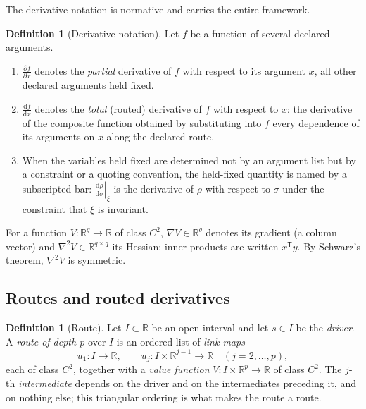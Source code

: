 \documentclass[11pt]{book}
\theoremstyle{plain}
\theoremstyle{definition}
\newtheorem{definition}[theorem]{Definition}
\theoremstyle{remark}
\newcommand{\SigmaM}{\Sigma_M}                   %
\newcommand{\dd}{\mathrm{d}}                                  %
\newcommand{\pd}[2]{\frac{\partial #1}{\partial #2}}          %
\newcommand{\td}[2]{\frac{\dd #1}{\dd #2}}                    %
\newcommand{\atfixed}[2]{\left.#1\right|_{#2}}                %
\begin{document}
The derivative notation is normative and carries the entire framework.

\begin{definition}[Derivative notation]\label{def:spine:notation}
Let $f$ be a function of several declared arguments.
\begin{enumerate}
  \item $\pd{f}{x}$ denotes the \emph{partial} derivative of $f$ with respect
        to its argument $x$, all other declared arguments held fixed.
  \item $\td{f}{x}$ denotes the \emph{total} (routed) derivative of $f$ with
        respect to $x$: the derivative of the composite function obtained by
        substituting into $f$ every dependence of its arguments on $x$ along
        the declared route.
  \item When the variables held fixed are determined not by an argument list
        but by a constraint or a quoting convention, the held-fixed quantity
        is named by a subscripted bar: $\atfixed{\td{\rho}{\sigma}}{\xi}$ is
        the derivative of $\rho$ with respect to $\sigma$ under the constraint
        that $\xi$ is invariant.
\end{enumerate}
For a function $V \colon \mathbb{R}^{q} \to \mathbb{R}$ of class $C^2$,
$\nabla V \in \mathbb{R}^{q}$ denotes its gradient (a column vector) and
$\nabla^2 V \in \mathbb{R}^{q \times q}$ its Hessian; inner products are
written $x^{\mathsf T} y$. By Schwarz's theorem, $\nabla^2 V$ is symmetric.
\end{definition}

\subsection{Routes and routed derivatives}\label{sec:spine:routes}

\begin{definition}[Route]\label{def:spine:route}
Let $I \subset \mathbb{R}$ be an open interval and let $s \in I$ be the
\emph{driver}. A \emph{route of depth $p$} over $I$ is an ordered list of
\emph{link maps}
\[
  u_1 \colon I \to \mathbb{R}, \qquad
  u_j \colon I \times \mathbb{R}^{j-1} \to \mathbb{R} \quad (j = 2, \ldots, p),
\]
each of class $C^2$, together with a \emph{value function}
$V \colon I \times \mathbb{R}^{p} \to \mathbb{R}$ of class $C^2$. The $j$-th
\emph{intermediate} depends on the driver and on the intermediates preceding
it, and on nothing else; this triangular ordering is what makes the route a
route.
\end{definition}
\end{document}
